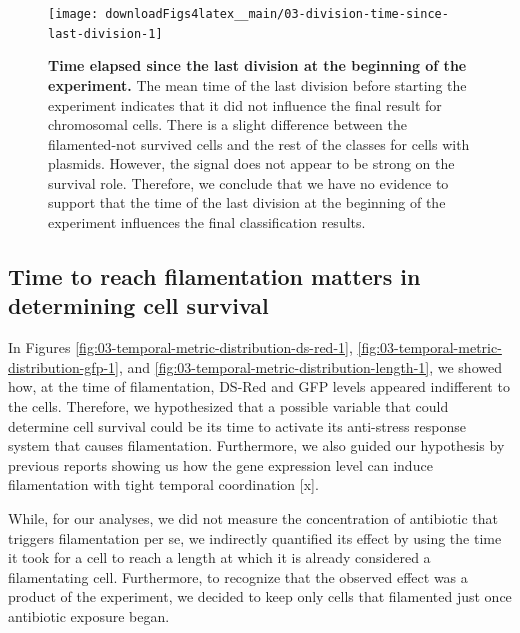 \documentclass[a4paper, nobind]{templates/ociamthesis}
\begin{document}
\begin{figure}[H]
\texttt{[image: downloadFigs4latex\_\_main/03-division-time-since-last-division-1]} \caption[Time elapsed since the last division at the beginning of the experiment.]{\textbf{Time elapsed since the last division at the beginning of the experiment.} The mean time of the last division before starting the experiment indicates that it did not influence the final result for chromosomal cells. There is a slight difference between the filamented-not survived cells and the rest of the classes for cells with plasmids. However, the signal does not appear to be strong on the survival role. Therefore, we conclude that we have no evidence to support that the time of the last division at the beginning of the experiment influences the final classification results.}\label{fig:03-division-time-since-last-division-1}
\end{figure}

\hypertarget{time-to-reach-filamentation-matters-in-determining-cell-survival}{%
\subsection{Time to reach filamentation matters in determining cell survival}\label{time-to-reach-filamentation-matters-in-determining-cell-survival}}

In Figures \ref{fig:03-temporal-metric-distribution-ds-red-1}, \ref{fig:03-temporal-metric-distribution-gfp-1}, and \ref{fig:03-temporal-metric-distribution-length-1}, we showed how, at the time of filamentation, DS-Red and GFP levels appeared indifferent to the cells.
Therefore, we hypothesized that a possible variable that could determine cell survival could be its time to activate its anti-stress response system that causes filamentation.
Furthermore, we also guided our hypothesis by previous reports showing us how the gene expression level can induce filamentation with tight temporal coordination {[}x{]}.

While, for our analyses, we did not measure the concentration of antibiotic that triggers filamentation per se, we indirectly quantified its effect by using the time it took for a cell to reach a length at which it is already considered a filamentating cell.
Furthermore, to recognize that the observed effect was a product of the experiment, we decided to keep only cells that filamented just once antibiotic exposure began.
\end{document}
